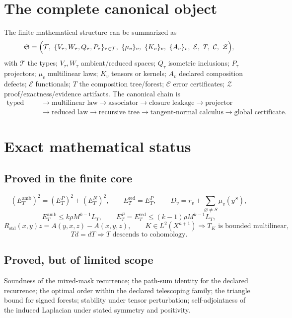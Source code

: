 \documentclass[11pt]{amsart}
\theoremstyle{definition}
\theoremstyle{remark}
\begin{document}
\section{The complete canonical object}

The finite mathematical structure can be summarized as
\[
\mathfrak S = \Bigl(\mathcal T,\ \{V_\tau,W_\tau,Q_\tau,P_\tau\}_{\tau\in\mathcal T},\ \{\mu_v\}_v,\ \{K_v\}_v,\ \{A_v\}_v,\ \mathcal E,\ T,\ \mathcal C,\ \mathcal Z\Bigr),
\]
with $\mathcal T$ the types; $V_\tau,W_\tau$ ambient/reduced spaces;
$Q_\tau$ isometric inclusions; $P_\tau$ projectors; $\mu_v$ multilinear
laws; $K_v$ tensors or kernels; $A_v$ declared composition defects;
$\mathcal E$ functionals; $T$ the composition tree/forest; $\mathcal C$
error certificates; $\mathcal Z$ proof/exactness/evidence artifacts.
The canonical chain is
\begin{align*}
\text{typed space} &\to \text{multilinear law} \to \text{associator}
\to \text{closure leakage} \to \text{projector}\\
&\to \text{reduced law}
\to \text{recursive tree} \to \text{tangent-normal calculus}
\to \text{global certificate}.
\end{align*}

\section{Exact mathematical status}
\label{sec:xxvi}

\subsection{Proved in the finite core}
\[
(E_T^{\mathrm{amb}})^2 = (E_T^P)^2+(E_T^N)^2,
\qquad
E_T^{\mathrm{red}}=E_T^P,
\qquad
D_v = r_v+\sum_{\varnothing\neq S}\mu_v(y^S),
\]
\[
E_T^{\mathrm{amb}} \le k\rho M^{k-1}L_T,
\qquad
E_T^{P}=E_T^{\mathrm{red}} \le (k-1)\rho M^{k-1}L_T,
\]
\[
R_{\mathrm{std}}(x,y)z = A(y,x,z)-A(x,y,z),
\qquad
K\in L^2(X^{a+1}) \Longrightarrow T_K \text{ is bounded multilinear},
\]
\[
Td=dT \Longrightarrow T \text{ descends to cohomology}.
\]

\subsection{Proved, but of limited scope}
Soundness of the mixed-mask recurrence; the path-sum identity for the
declared recurrence; the optimal order within the declared telescoping
family; the triangle bound for signed forests; stability under tensor
perturbation; self-adjointness of the induced Laplacian under stated
symmetry and positivity.
\end{document}
